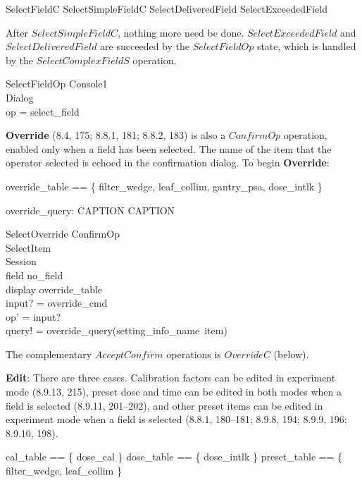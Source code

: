 \documentclass{article}
\begin{document}
\begin{zed} 
	SelectFieldC  
	 SelectSimpleFieldC \lor SelectDeliveredField \lor SelectExceededField
\end{zed}
After $SelectSimpleFieldC$, nothing more need be done.
$SelectExceededField$ and $SelectDeliveredField$ are succeeded by the 
$SelectFieldOp$ state, which is handled by the $SelectComplexFieldS$
operation.  

\begin{schema}{SelectFieldOp}
	Console1 \\
	Dialog \\
\where
	op = select\_field
\end{schema}

{\bf Override} (8.4, 175; 8.8.1, 181; 8.8.2, 183) is also a $ConfirmOp$
operation, enabled only when a field has been selected.  The name of
the item that the operator selected is echoed in the confirmation
dialog.  To begin {\bf Override}:

\begin{zed}
override\_table == \{ filter\_wedge, leaf\_collim, gantry\_psa, dose\_intlk \}
\end{zed}

\begin{axdef}
	override\_query: CAPTION \fun CAPTION
\end{axdef}

\begin{schema}{SelectOverride}
	ConfirmOp \\
	SelectItem \\
	\Xi Session \\
\where
	field \neq no\_field \\
	display \in override\_table \\
	input? = override\_cmd \\
	op' = input? \\
	query! = override\_query(setting\_info\_name~item)
\end{schema}
The complementary $AcceptConfirm$ operations is $OverrideC$ (below).

{\bf Edit}: There are three cases.  Calibration factors can be edited
in experiment mode (8.9.13, 215), preset dose and time can be edited
in both modes when a field is selected (8.9.11, 201--202), and other
preset items can be edited in experiment mode when a field is selected
(8.8.1, 180--181; 8.9.8, 194; 8.9.9, 196; 8.9.10, 198).

\begin{zed}
	cal\_table == \{ dose\_cal \}
\also
	dose\_table == \{ dose\_intlk \}
\also
	preset\_table == \{ filter\_wedge, leaf\_collim \}
\end{zed}
\end{document}
